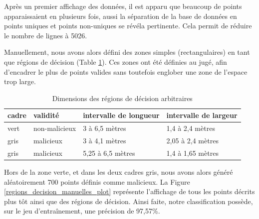\documentclass[a4paper]{report}
\begin{document}
Après un premier affichage des données, il est apparu que beaucoup de points apparaissaient en plusieurs fois, aussi la séparation de la base de données en points uniques et points non-uniques se révéla pertinente. Cela permit de réduire le nombre de lignes à 5026.

Manuellement, nous avons alors défini des zones simples (rectangulaires) en tant que régions de décision (Table \ref{regions_decision_manuelles_valeurs}). Ces zones ont été définies au jugé, afin d'encadrer le plus de points valides sans toutefois englober une zone de l'espace trop large.

\begin{table}[h]
\centering
\begin{tabular}{llll}
cadre & validité & intervalle de longueur & intervalle de largeur \\
\hline
vert & non-malicieux & 3 à 6,5 mètres & 1,4 à 2,4 mètres \\
gris & malicieux & 3 à 4,1 mètres & 2,05 à 2,4 mètres \\
gris & malicieux & 5,25 à 6,5 mètres & 1,4 à 1,65 mètres \\
\end{tabular}
\caption{Dimensions des régions de décision arbitraires\label{regions_decision_manuelles_valeurs}}
\end{table}


Hors de la zone verte, et dans les deux cadres gris, nous avons alors généré aléatoirement 700 points définis comme malicieux. La Figure \ref{regions_decision_manuelles_plot} représente l'affichage de tous les points décrits plus tôt ainsi que des régions de décision. Ainsi faite, notre classification possède, sur le jeu d'entraînement, une précision de 97,57\%.
\end{document}
